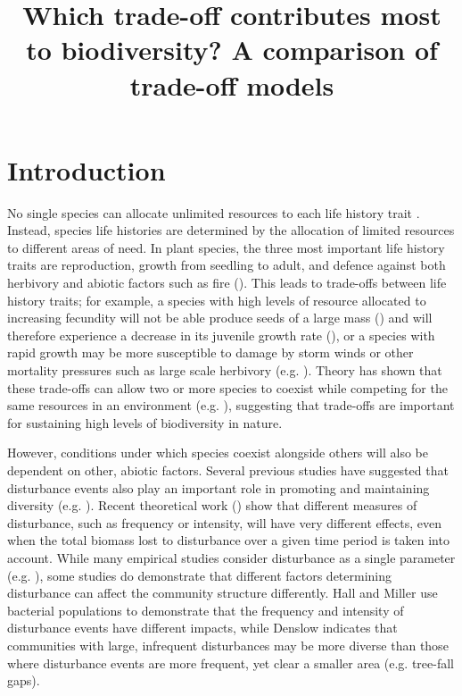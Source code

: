 \documentclass[preprint,10pt,reqno]{amsart}
\begin{document}
\title{Which trade-off contributes most to biodiversity? A comparison of trade-off models}
\maketitle

\section{Introduction}
No single species can allocate unlimited resources to each life history trait \cite{law1979optimal}. Instead, species life histories are determined by the allocation of limited resources to different areas of need. In plant species, the three most important life history traits are reproduction, growth from seedling to adult, and defence against both herbivory and abiotic factors such as fire (\cite{bazzaz1987allocating}). This leads to trade-offs between life history traits; for example, a species with high levels of resource allocated to increasing fecundity will not be able produce seeds of a large mass (\cite{turnbull1999seed}) and will therefore experience a decrease in its juvenile growth rate (\cite{gross1984effects}), or a species with rapid growth may be more susceptible to damage by storm winds or other mortality pressures such as large scale herbivory (e.g. \cite{wright2010functional,fine2006growth}). Theory has shown that these trade-offs can allow two or more species to coexist while competing for  the same resources in an environment (e.g. \cite{kisdi2003coexistence,levins1971regional,bonsall2004life}), suggesting that trade-offs are important for sustaining high levels of biodiversity in nature.

However, conditions under which species coexist alongside others will also be dependent on other, abiotic factors. Several previous studies have suggested that disturbance events also play an important role in promoting and maintaining diversity (e.g. \cite{sousa1984role,denslow1987tropical}).  Recent theoretical work (\cite{miller2011frequency}) show that different measures of disturbance, such as frequency or intensity, will have very different effects, even when the total biomass lost to disturbance over a given time period is taken into account. While many empirical studies consider disturbance as a single parameter (e.g. \cite{molino2001tree,peterson1997tornado,nakagawa2000impact}), some studies do demonstrate that different factors determining disturbance can affect the community structure differently. Hall and Miller \cite{hall2012diversity} use bacterial populations to demonstrate that the frequency and intensity of disturbance events have different impacts, while Denslow \cite{denslow1980patterns} indicates that communities with large, infrequent disturbances may be more diverse than those where disturbance events are more frequent, yet clear a smaller area (e.g. tree-fall gaps).
\end{document}
